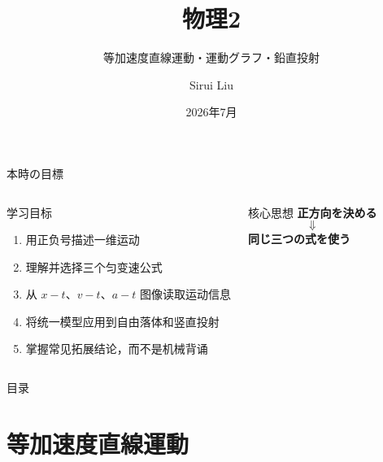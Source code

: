 \documentclass[notheorems,aspectratio=169]{beamer}
\title[EJU Physics]{物理2}
\subtitle{等加速度直線運動・運動グラフ・鉛直投射}
\author[Sirui Liu]{Sirui Liu}
\date{2026年7月}
\newcommand{\jp}[1]{\textbf{\color{JapanBlue}#1}}
\newcommand{\key}[1]{\textbf{\color{ChinaRed}#1}}
\begin{document}
\begin{frame}
  \titlepage
\end{frame}

\begin{frame}{本時の目標}
  \begin{columns}[T,onlytextwidth]
    \begin{block}{学习目标}
      \begin{enumerate}
        \item 用正负号描述一维运动
        \item 理解并选择三个匀变速公式
        \item 从 $x-t$、$v-t$、$a-t$ 图像读取运动信息
        \item 将统一模型应用到自由落体和竖直投射
        \item 掌握常见拓展结论，而不是机械背诵
      \end{enumerate}
    \end{block}
    \begin{alertblock}{核心思想}
      \centering
      \Large
      \jp{正方向を決める}
      \[
        \Downarrow
      \]
      \key{同じ三つの式を使う}
    \end{alertblock}
  \end{columns}
\end{frame}

\begin{frame}{目录}
  \tableofcontents
\end{frame}

\section{等加速度直線運動}
\end{document}
